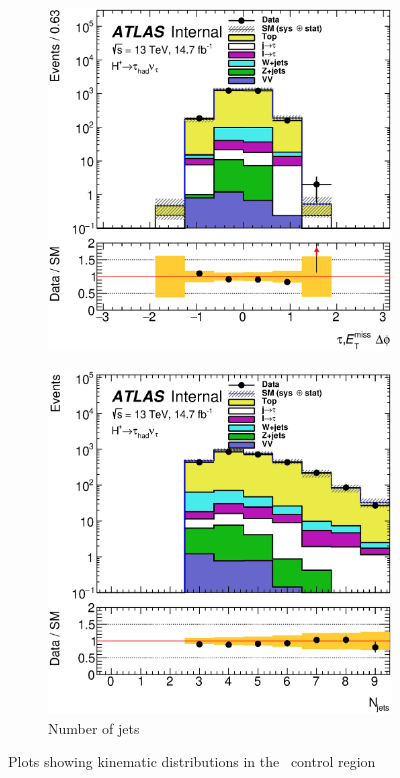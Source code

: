 \begin{figure}[!h]
\begin{subfigure}{0.5\textwidth}
\caption{\mT}
\end{subfigure}
\begin{subfigure}{0.5\textwidth}
   \includegraphics[width=\textwidth]{figures/taumetphi_TTBar.eps}
\caption{}
\end{subfigure} %
\begin{subfigure}{0.5\textwidth}
   \includegraphics[width=\textwidth]{figures/nJets_TTBar.eps}
\caption{Number of jets}
\end{subfigure}
\caption{Plots showing kinematic distributions in the \ttbar\ control region}
\label{fig:ttBarCR}
\end{figure}


